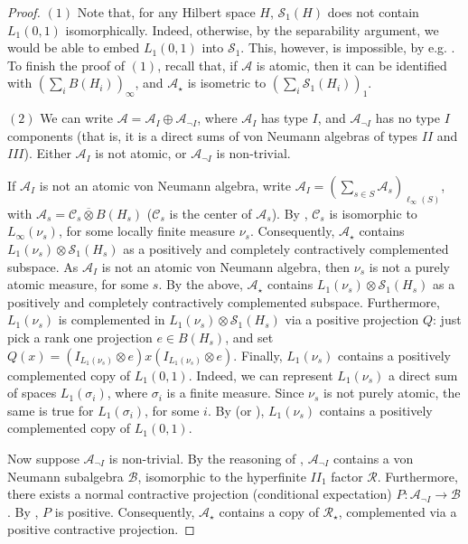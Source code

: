 \documentclass[12pt]{amsart}
\theoremstyle{plain}
\theoremstyle{definition}
\newcommand{\is}{\mathcal S}
\newcommand{\A}{\mathcal{A}}
\begin{document}
\begin{proof}
$(1)$
Note that, for any Hilbert space $H$, $\is_1(H)$ does not contain $L_1(0,1)$
isomorphically. Indeed, otherwise, by the separability argument, we would
be able to embed $L_1(0,1)$ into $\is_1$. This, however, is impossible, by e.g.
\cite{Fr}. To finish the proof of $(1)$, recall that, if $\A$ is atomic,
then it can be identified with $(\sum_i B(H_i))_\infty$, and
$\A_\star$ is isometric to $(\sum_i \is_1(H_i))_1$.

$(2)$
We can write $\A = \A_I \oplus \A_{\lnot I}$, where $\A_I$ has type $I$, and
$\A_{\lnot I}$ has no type $I$ components (that is, it is a direct sums
of von Neumann algebras of types $II$ and $III$). Either $\A_I$ is not atomic,
or $\A_{\lnot I}$ is non-trivial.

If $\A_I$ is not an atomic von Neumann algebra,
write $\A_I = (\sum_{s \in S} \A_s)_{\ell_\infty(S)}$, with
$\A_s = {\mathcal{C}}_s \overline{\otimes} B(H_s)$
(${\mathcal{C}}_s$ is the center of $\A_s$).
By \cite[Theorem III.1.18]{Tak}, ${\mathcal{C}}_s$
is isomorphic to $L_\infty(\nu_s)$, for some locally
finite measure $\nu_s$. Consequently,
$\A_\star$ contains $L_1(\nu_s) \otimes \is_1(H_s)$ as a positively
and completely contractively complemented subspace.
As $\A_I$ is not an atomic von Neumann algebra,
then $\nu_s$ is not a purely atomic measure, for some $s$.
By the above,
$\A_\star$ contains $L_1(\nu_s) \otimes \is_1(H_s)$ as a positively
and completely contractively complemented subspace.
Furthermore, $L_1(\nu_s)$ is complemented in
$L_1(\nu_s) \otimes \is_1(H_s)$ via a positive projection $Q$: just
pick a rank one projection $e \in B(H_s)$, and set
$Q(x) = (I_{L_1(\nu_s)} \otimes e)x(I_{L_1(\nu_s)} \otimes e)$.
Finally, $L_1(\nu_s)$ contains a positively complemented copy of $L_1(0,1)$.
Indeed, we can represent $L_1(\nu_s)$ a direct sum of spaces $L_1(\sigma_i)$,
where $\sigma_i$ is a finite measure. Since $\nu_s$ is not purely atomic,
the same is true for $L_1(\sigma_i)$, for some $i$.
By \cite[Theorem III.1.22]{Tak} (or \cite[Theorem 9.4.1]{KR2}),
$L_1(\nu_s)$ contains a positively complemented copy of $L_1(0,1)$.

Now suppose $\A_{\lnot I}$ is non-trivial. By the reasoning of
\cite[Page 217]{MNha}, $\A_{\lnot I}$ contains a von Neumann subalgebra
${\mathcal{B}}$, isomorphic to the hyperfinite $II_1$ factor ${\mathcal{R}}$.
Furthermore, there exists a normal contractive projection (conditional expectation)
$P : \A_{\lnot I} \to {\mathcal{B}}$. By \cite[Theorem III.3.4]{Tak}, $P$ is positive.
Consequently, $\A_\star$ contains a copy of ${\mathcal{R}}_\star$, complemented via
a positive contractive projection.


\end{proof}
\end{document}
